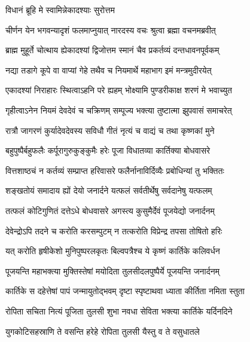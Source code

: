

\onelineshloka
{विधानं ब्रूहि मे स्वामिन्नेकादश्याः सुरोत्तम} %

\twolineshloka
{चीर्णन येन भगवन्यादृशं फलमाप्नुयात्}
{नारदस्य वचः श्रुत्वा ब्रह्मा वचनमब्रवीत्} %


\twolineshloka
{ब्राह्म मुहूर्ते चोत्थाय ह्येकादश्यां द्विजोत्तम}
{स्मानं चैव प्रकर्तव्यं दन्तधावनपूर्वकम्} %

\twolineshloka
{नद्या तडागे कूपे वा वाप्यां गेहे तथैव च}
{नियमार्थे महाभाग इमं मन्त्रमुदीरयेत्} %

\twolineshloka
{एकादश्यां निराहारः स्थित्वाऽहनि परे ह्यहम्}
{भोक्ष्यामि पुण्डरीकाक्ष शरणं मे भवाच्युत} %

\twolineshloka
{गृहीत्वाऽनेन नियमं देवदेवं च चक्रिणम्}
{सम्पूज्य भक्त्या तुष्टात्मा झुपवासं समाचरेत्} %

\twolineshloka
{रात्रौ जागरणं कुर्यादेवदेवस्य सविधौ}
{गीतं नृत्यं च वाद्यं च तथा कृष्णकां मुने} %

\twolineshloka
{बहुपुष्पैर्बहुफलैः कर्पूरागुरुकुङ्कुमैः}
{हरेः पूजा विधातव्या कार्तिक्या बोधवासरे} %

\twolineshloka
{वित्तशाष्ठचं न कर्तव्यं सम्प्राप्त हरिवासरे}
{फलैर्नानाविर्दिव्यैः प्रबोधिन्यां तु भक्तितः} %

\twolineshloka
{शङ्खतोयं समादाय ह्यों देयो जनार्दने}
{यत्फलं सर्वतीर्थेषु सर्वदानेषु यत्फलम्} %

\twolineshloka
{तत्फलं कोटिगुणितं दत्तेऽधे बोधवासरे}
{अगस्त्य कुसुमैर्देवं पूजयेद्यो जनार्दनम्} %

\twolineshloka
{देवेन्द्रोऽपि तदने च करोति करसम्पुटम्}
{न तत्करोति विप्रेन्द्र तपसा तोषितो हरिः} %

\twolineshloka
{यत् करोति हृषीकेशो मुनिपुष्परलकृतः}
{बिल्वपत्रैश्च ये कृष्णं कार्तिके कलिवर्धन} %

\twolineshloka
{पूजयन्ति महाभक्त्या मुक्तिस्तेषां मयोदिता}
{तुलसीदलपुष्पैर्ये पूजयन्ति जनार्दनम्} %

\twolineshloka
{कार्तिके स दहेत्तेषां पापं जन्मायुतोद्भवम्}
{दृष्टा स्पृष्टाथवा ध्याता कीर्तिता नमिता स्तुता} %

\twolineshloka
{रोपिता सचिता नित्यं पूजिता तुलसी शुभा}
{नवधा सेविता भक्त्या कार्तिके यर्दिनदिने} %

\twolineshloka
{युगकोटिसहस्राणि ते वसन्ति हरेहे}
{रोपिता तुलसी यैस्तु व ते वसुधातले} %

